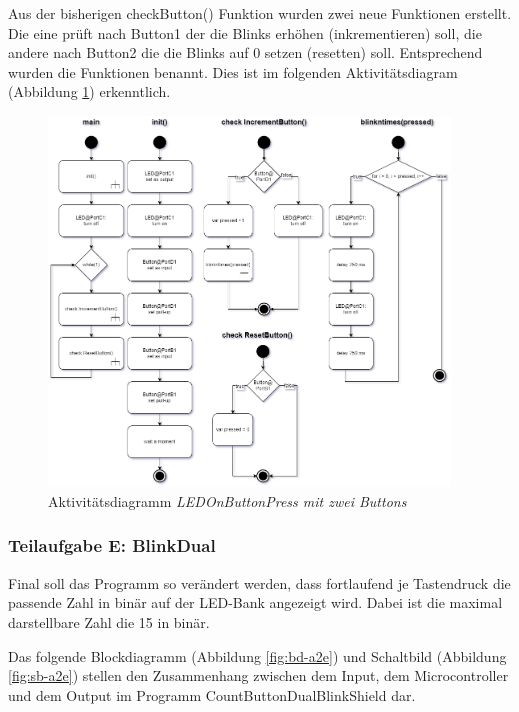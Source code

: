 \documentclass{article}
\begin{document}
\noindent Aus der bisherigen checkButton() Funktion wurden zwei neue Funktionen erstellt. Die eine prüft nach Button1 der die Blinks erhöhen (inkrementieren) soll, die andere nach Button2 die die Blinks auf 0 setzen (resetten) soll. Entsprechend wurden die Funktionen benannt. Dies ist im folgenden Aktivitätsdiagram (Abbildung \ref{fig:ad-a2d}) erkenntlich.

\begin{figure}[htb]
    \centering
    \includegraphics[width=0.95\textwidth]{images/A2d-AD.png}
    \caption{Aktivitätsdiagramm \textit{LEDOnButtonPress mit zwei Buttons}}
    \label{fig:ad-a2d}
\end{figure}

\newpage

\subsubsection{Teilaufgabe E: BlinkDual}

\noindent Final soll das Programm so verändert werden, dass fortlaufend je Tastendruck die passende Zahl in binär auf der LED-Bank angezeigt wird. Dabei ist die maximal darstellbare Zahl die 15 in binär. 

\noindent Das folgende Blockdiagramm (Abbildung \ref{fig:bd-a2e}) und Schaltbild (Abbildung \ref{fig:sb-a2e}) stellen den Zusammenhang zwischen dem Input, dem Microcontroller und dem Output im Programm CountButtonDualBlinkShield dar.
\end{document}
